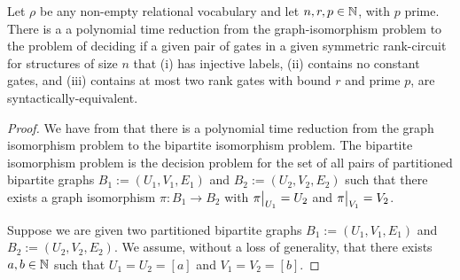 \documentclass[../paper.tex]{subfiles}
\begin{document}
\begin{prop}
  Let $\rho$ be any non-empty relational vocabulary and let $n, r, p \in \mathbb{N}$,
  with $p$ prime. There is a a polynomial time reduction from the
  graph-isomorphism problem to the problem of deciding if a given pair of gates
  in a given symmetric rank-circuit for structures of size $n$ that (i) has
  injective labels, (ii) contains no constant gates, and (iii) contains at most
  two rank gates with bound $r$ and prime $p$, are syntactically-equivalent.
  \label{prop:syntactic-graph-iso}
\end{prop}
\begin{proof}
  We have from \cite{} that there is a polynomial time reduction from the graph
  isomorphism problem to the bipartite isomorphism problem. The bipartite
  isomorphism problem is the decision problem for the set of all pairs of
  partitioned bipartite graphs $B_1 := (U_1, V_1, E_1)$ and $B_2 := (U_2, V_2,
  E_2)$ such that there exists a graph isomorphism $\pi : B_1 \rightarrow B_2$
  with $\restr{\pi}{U_1} = U_2$ and $\restr{\pi}{V_1} = V_2$.

  Suppose we are given two partitioned bipartite graphs $B_1 := (U_1, V_1, E_1)$
  and $B_2 := (U_2, V_2, E_2)$. We assume, without a loss of generality, that
  there exists $a, b \in \mathbb{N}$ such that $U_1 = U_2 = [a]$ and $V_1 = V_2 =
  [b]$.


\end{proof}
\end{document}
